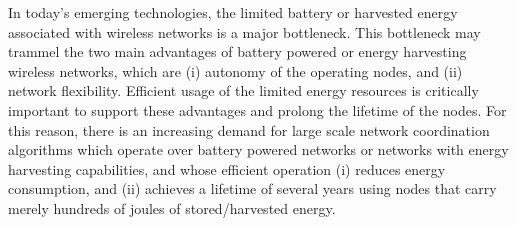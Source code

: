 \documentclass[twocolumn]{autart}    %
\begin{document}
In today's emerging technologies, the limited battery or harvested energy associated with wireless networks is a major bottleneck. 
This bottleneck may trammel the two main advantages of battery powered or energy harvesting wireless networks, which are (i) autonomy of the operating nodes, and (ii) network flexibility. 
Efficient usage of the limited energy resources is critically important to support these advantages and prolong the lifetime of the nodes. 
For this reason, there is an increasing demand for large scale network coordination algorithms which operate over battery powered networks or networks with energy harvesting capabilities, and whose efficient operation (i) reduces energy consumption, and (ii) achieves a lifetime of several years using nodes that carry merely hundreds of joules of stored/harvested energy.  
\end{document}
